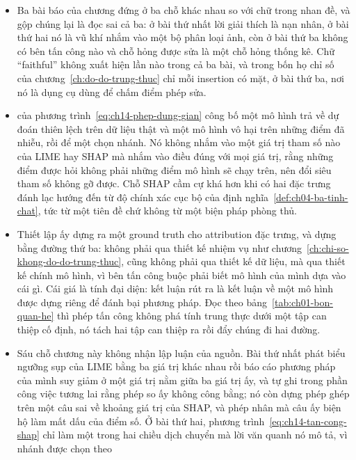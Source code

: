 \begin{tomtat}
\begin{itemize}
  \item Ba bài báo của chương đứng ở ba chỗ khác nhau so với chữ trong nhan đề,
và gộp chúng lại là đọc sai cả ba: ở bài thứ nhất lời giải thích là nạn nhân, ở
bài thứ hai nó là vũ khí nhắm vào một bộ phân loại ảnh, còn ở bài thứ ba không
có bên tấn công nào và chỗ hỏng được sửa là một chỗ hỏng thống kê. Chữ
  \enquote{faithful} không xuất hiện lần nào trong cả ba bài, và trong bốn họ
chỉ số của chương~\ref{ch:do-do-trung-thuc} chỉ mỗi insertion có mặt, ở bài thứ
ba, nơi nó là dụng cụ dùng để chấm điểm phép sửa.
  \item {} của phương trình~\ref{eq:ch14-phep-dung-gian} công bố một
mô hình trả về dự đoán thiên lệch trên dữ liệu thật và một mô hình vô hại trên
những điểm đã nhiễu, rồi để một
   chọn nhánh. Nó
không nhắm vào một giá trị tham số nào của LIME hay SHAP mà nhắm vào điều đúng
với mọi giá trị, rằng những điểm được hỏi không phải những điểm mô hình sẽ chạy
trên, nên đổi siêu tham số không gỡ được. Chỗ SHAP cầm cự khá hơn khi có hai
đặc trưng đánh lạc hướng đến từ độ chính xác cục bộ của định
nghĩa~\ref{def:ch04-ba-tinh-chat}, tức từ một tiên đề chứ không từ một biện
pháp phòng thủ.
  \item Thiết lập ấy dựng ra một ground truth cho attribution đặc trưng, và dựng
bằng đường thứ ba: không phải qua thiết kế nhiệm vụ như
chương~\ref{ch:chi-so-khong-do-do-trung-thuc}, cũng không phải qua thiết kế dữ
liệu, mà qua thiết kế chính mô hình, vì bên tấn công buộc phải biết mô hình của
mình dựa vào cái gì. Cái giá là tính đại diện: kết luận rút ra là kết luận về
một mô hình được dựng riêng để đánh bại phương pháp. Đọc theo
bảng~\ref{tab:ch01-bon-quan-he} thì phép tấn công không phá tính trung thực
dưới một tập can thiệp cố định, nó tách hai tập can thiệp ra rồi đẩy chúng đi
hai đường.
  \item Sáu chỗ chương này không nhận lập luận của nguồn. Bài thứ nhất phát biểu
ngưỡng sụp của LIME bằng ba giá trị khác nhau rồi báo cáo phương pháp của mình
suy giảm ở một giá trị nằm giữa ba giá trị ấy, và tự ghi trong phần công việc
tương lai rằng phép so ấy không công bằng; nó còn dựng phép ghép trên một câu
sai về khoảng giá trị của SHAP, và phép nhân mà câu ấy biện hộ làm mất dấu của
điểm số. Ở bài thứ hai, phương trình~\ref{eq:ch14-tan-cong-shap} chỉ làm một
trong hai chiều dịch chuyển mà lời văn quanh nó mô tả, vì nhánh được chọn theo

\end{itemize}
\end{tomtat}
